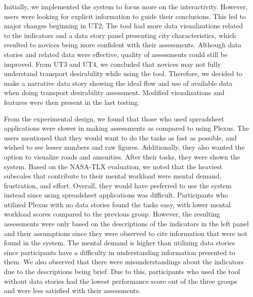 \documentclass{sigchi}
\begin{document}

Initially, we implemented the system to focus more on the interactivity. However, users were looking for explicit information to guide their conclusions. This led to major changes beginning in UT2; The tool had more data visualizations related to the indicators and a data story panel presenting city characteristics, which resulted to novices being more confident with their assessments. Although data stories and related data were effective, quality of assessments could still be improved. From UT3 and UT4, we concluded that novices may not fully understand transport desirability while using the tool. Therefore, we decided to make a narrative data story showing the ideal flow and use of available data when doing transport desirability assessment. Modified visualizations and features were then present in the last testing.

From the experimental design, we found that those who used spreadsheet applications were slower in making assessments as compared to using Plexus. The users mentioned that they would want to do the tasks as fast as possible, and wished to see lesser numbers and raw figures. Additionally, they also wanted the option to visualize roads and amenities. After their tasks, they were shown the system. Based on the NASA-TLX evaluation, we noted that the heaviest subscales that contribute to their mental workload were mental demand, frustration, and effort. Overall, they would have preferred to use the system instead since using spreadsheet applications was difficult. Participants who utilized Plexus with no data stories found the tasks easy, with lower mental workload scores compared to the previous group. However, the resulting assessments were only based on the descriptions of the indicators in the left panel and their assumptions since they were observed to cite information that were not found in the system. The mental demand is higher than utilizing data stories since participants have a difficulty in understanding information presented to them.  We also observed that there were misunderstandings about the indicators due to the descriptions being brief. Due to this, participants who used the tool without data stories had the lowest performance score out of the three groups and were less satisfied with their assessments. 
\end{document}
